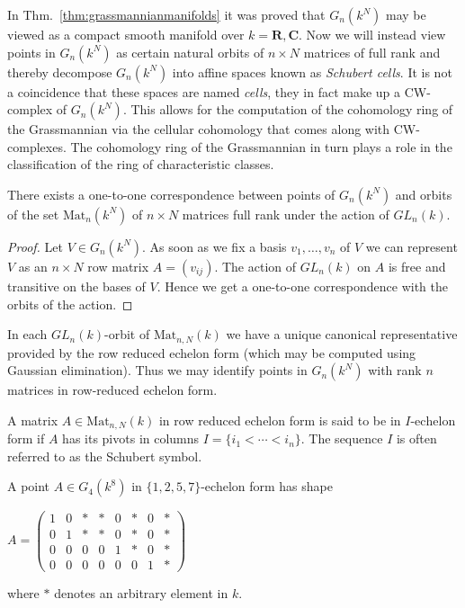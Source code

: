 \documentclass[a4paper,openany]{scrbook}
\begin{document}
In Thm.~\ref{thm:grassmannianmanifolds} it was proved that $G_n(k^N)$ may be viewed as a compact smooth manifold over $k = \mathbf{R}, \mathbf{C}$. 
Now we will instead view points in $G_n(k^N)$ as certain natural orbits of $n \times N$ matrices of full rank and thereby decompose $G_n(k^N)$ into affine spaces known as \textit{Schubert cells}. 
It is not a coincidence that these spaces are named \textit{cells}, they in fact make up a CW-complex of $G_n(k^N)$. 
This allows for the computation of the cohomology ring of the Grassmannian via the cellular cohomology that comes along with CW-complexes. 
The cohomology ring of the Grassmannian in turn plays a role in the classification of the ring of characteristic classes. 
\begin{prop}
There exists a one-to-one correspondence between points of $G_n(k^N)$ and orbits of the set $\text{Mat}_n(k^N)$ of $n \times N$ matrices full rank under the action of $GL_n(k)$.
\end{prop}
\begin{proof}
Let $V \in G_n(k^N)$. As soon as we fix a basis $v_1, \dots, v_n$ of $V$ we can represent $V$ as an $n \times N$ row matrix $A = (v_{ij})$. The action of $GL_n(k)$ on $A$ is free and transitive on the bases of $V$. 
Hence we get a one-to-one correspondence with the orbits of the action. 
\end{proof} \noindent
\begin{remark}
\label{rem:echelonform}
In each $GL_n(k)$-orbit of $\text{Mat}_{n,N}(k)$ we have a unique canonical representative provided by the row reduced echelon form (which may be computed using Gaussian elimination). 
Thus we may identify points in $G_n(k^N)$ with rank $n$ matrices in row-reduced echelon form.
\end{remark}
\begin{defn} \noindent
A matrix $A \in \text{Mat}_{n,N}(k)$ in row reduced echelon form is said to be in $I\text{-echelon}$ form if $A$ has its pivots in columns $I = \{i_1 < \cdots < i_n \}$. 
The sequence $I$ is often referred to as the Schubert symbol.
\end{defn}
\begin{example} \normalfont
\label{ex:echelonform}
A point $A \in G_4(k^{8})$ in $\{ 1,2,5,7\}$-echelon form has shape
\begin{center}
$A = \begin{pmatrix}
  1 & 0 & * & * & 0 & * & 0 & * \\
  0 & 1 & * & * & 0 & * & 0 & * \\
  0 & 0 & 0 & 0 & 1 & * & 0 & * \\
  0 & 0 & 0 & 0 & 0 & 0 & 1 & *
 \end{pmatrix}$
\end{center}  \noindent
where $*$ denotes an arbitrary element in $k$.  
\end{example} \noindent
\end{document}
